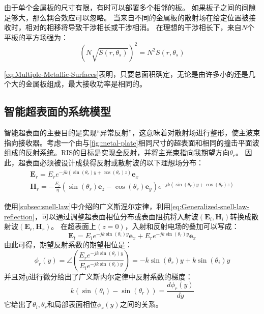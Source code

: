 \documentclass[supercite]{HustGraduPaper}
\begin{document}
由于单个金属板的尺寸有限，有时可以部署多个相邻的板。
如果板子之间的间隙足够大，那么耦合效应可以忽略。
当来自不同的金属板的散射场在给定位置被接收时，相对的相移将导致干涉相长或干涉相消。
在理想的干涉相长下，来自$N$个平板的平方场强为：
\begin{equation}
	\left(N \sqrt{S\left(r, \theta_{s}\right)}\right)^{2}=N^{2} S\left(r, \theta_{s}\right)
	\label{eq:Multiple-Metallic-Surfaces}
\end{equation}

\autoref{eq:Multiple-Metallic-Surfaces}表明，只要总面积确定，无论是由许多小的还是几个大的金属板组成，最大接收功率是相同的。

\subsection{智能超表面的系统模型}

智能超表面的主要目的是实现“异常反射”\cite{liang2015anomalous}，这意味着对散射场进行整形，使主波束指向接收器。考虑一个由与\autoref{fig:metal-plate}相同尺寸的超表面和相同的撞击平面波组成的反射系统。RIS的目标是实现全反射，并将主光束指向我期望方向$\theta_r$。
因此，超表面必须被设计成获得反射或散射波的以下理想场分布：
\begin{equation}
	\begin{array}{l}
		\mathbf{E}_{r}=E_{r} e^{-j k\left(\sin \left(\theta_{r}\right) y+\cos \left(\theta_{r}\right) z\right)} \boldsymbol{e}_{x} \\
		\mathbf{H}_{r}=-\frac{E_{r}}{\eta}\left(\sin \left(\theta_{r}\right) \boldsymbol{e}_{z}-\cos \left(\theta_{r}\right) \boldsymbol{e}_{y}\right) e^{-j k\left(\sin \left(\theta_{r}\right) y+\cos \left(\theta_{r}\right) z\right)}
	\end{array}
\end{equation}

使用\autoref{subsec:snell-law}中介绍的广义斯涅尔定律，利用\autoref{eq:Generalized-snell-law-reflection}，可以通过调整超表面相位分布或表面阻抗将入射波$\left(\mathbf{E}_{i}, \mathbf{H}_{i}\right)$转换成散射波$\left(\mathbf{E}_{r}, \mathbf{H}_{r}\right)$。
在超表面上$(z = 0)$，入射和反射电场的叠加可以写成\cite{Asadchy_2016}：
\begin{equation}
	\mathbf{E}_{t}=E_{i} e^{-j k \sin \left(\theta_{i}\right) y} \boldsymbol{e}_{x}+E_{r} e^{-j k \sin \left(\theta_{r}\right) y} \boldsymbol{e}_{x}
\end{equation}
由此可得，期望反射系数的期望相位是：
\begin{equation}
	\phi_{r}(y)=\angle\left(\frac{E_{r} e^{-j k \sin \left(\theta_{r}\right) y}}{E_{i} e^{-j k \sin \left(\theta_{i}\right) y}}\right)=-k \sin \left(\theta_{r}\right) y+k \sin \left(\theta_{i}\right) y
\end{equation}
并且对$y$进行微分给出了广义斯内尔定律中反射系数的梯度：
\begin{equation}
	k\left(\sin \left(\theta_{i}\right)-\sin \left(\theta_{r}\right)\right)=\frac{d \phi_{r}(y)}{d y}
\end{equation}
它给出了$\theta_i,\theta_r$和局部表面相位$\phi_{r}(y)$之间的关系。
\end{document}
